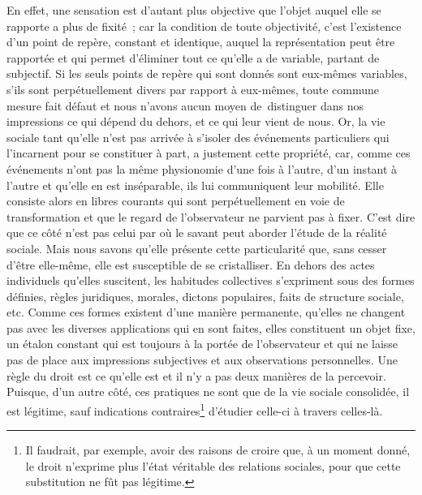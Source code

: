 \documentclass[french,twoside]{book} %
\begin{document}
En effet, une sensation est d’autant plus objective que l’objet auquel elle se rapporte a plus de fixité ; car la condition de toute objectivité, c’est l’existence d’un point de repère, constant et identique, auquel la représentation peut être rapportée et qui permet d’éliminer tout ce qu’elle a de variable, partant de subjectif. Si les seuls points de repère qui sont donnés sont eux-mêmes variables, s’ils sont perpétuellement divers par rapport à eux-mêmes, toute commune mesure fait défaut et nous n’avons aucun moyen de distinguer dans nos impressions ce qui dépend du dehors, et ce qui leur vient de nous. Or, la vie sociale tant qu’elle n’est pas arrivée à s’isoler des événements particuliers qui l’incarnent pour se constituer à part, a justement cette propriété, car, comme ces événements n’ont pas la même physionomie d’une fois à l’autre, d’un instant à l’autre et qu’elle en est inséparable, ils lui communiquent leur mobilité. Elle consiste alors en libres courants qui sont perpétuellement en voie de transformation et que le regard de l’observateur ne parvient pas à fixer. C’est dire que ce côté n’est pas celui par où le savant peut aborder l’étude de la réalité sociale. Mais nous savons qu’elle présente cette particularité que, sans cesser d’être elle-même, elle est susceptible de se cristalliser. En dehors des actes individuels qu’elles suscitent, les habitudes collectives s’expriment sous des formes définies, règles juridiques, morales, dictons populaires, faits de structure sociale, etc. Comme ces formes existent d’une manière permanente, qu’elles ne changent pas avec les diverses applications qui en sont faites, elles constituent un objet fixe, un étalon constant qui est toujours à la portée de l’observateur et qui ne laisse pas de place aux impressions subjectives et aux observations personnelles. Une règle du droit est ce qu’elle est et il n’y a pas deux manières de la percevoir. Puisque, d’un autre côté, ces pratiques ne sont que de la vie sociale consolidée, il est légitime, sauf indications contraires\footnote{ Il faudrait, par exemple, avoir des raisons de croire que, à un moment donné, le droit n’exprime plus l’état véritable des relations sociales, pour que cette substitution ne fût pas légitime.} d’étudier celle-ci à travers celles-là.\par
\end{document}
